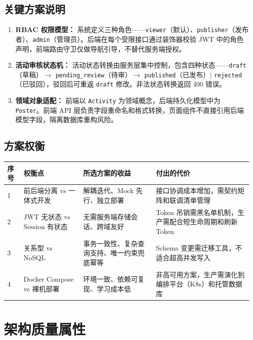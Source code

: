 \documentclass[12pt,a4paper]{ctexart}
\begin{document}
\subsection{关键方案说明}
\begin{enumerate}
\item \textbf{RBAC 权限模型：} 系统定义三种角色——\texttt{viewer}（默认）、\texttt{publisher}（发布者）、\texttt{admin}（管理员）。后端在每个受限接口通过装饰器校验 JWT 中的角色声明，前端路由守卫仅做导航引导，不替代服务端授权。
\item \textbf{活动审核状态机：} 活动状态转换由服务层集中控制，包含四种状态——\texttt{draft}（草稿）$\rightarrow$ \texttt{pending\_review}（待审）$\rightarrow$ \texttt{published}（已发布）$\mid$ \texttt{rejected}（已驳回），驳回后可重返 \texttt{draft} 修改。非法状态转换返回 400 错误。
\item \textbf{领域对象适配：} 前端以 \texttt{Activity} 为领域概念，后端持久化模型中为 \texttt{Poster}。前端 API 层负责字段重命名和格式转换，页面组件不直接引用后端模型字段，隔离数据库重构风险。
\end{enumerate}

\subsection{方案权衡}
\noindent\begin{tabularx}{\textwidth}{p{1.5cm}p{3.2cm}p{4.5cm}p{4.5cm}}
\toprule 序号 & 权衡点 & 所选方案的收益 & 付出的代价 \\\midrule
1 & 前后端分离 vs 一体式开发 & 解耦迭代、Mock 先行、独立部署 & 接口协调成本增加，需契约矩阵和联调清单管理 \\
2 & JWT 无状态 vs Session 有状态 & 无需服务端存储会话、跨域友好 & Token 吊销需黑名单机制，生产需配合短生命周期和刷新 Token \\
3 & 关系型 vs NoSQL & 事务一致性、复杂查询支持、唯一约束兜底幂等 & Schema 变更需迁移工具，不适合超高并发写入 \\
4 & Docker Compose vs 裸机部署 & 环境一致、依赖可复现、学习成本低 & 非高可用方案，生产需演化到编排平台（K8s）和托管数据库 \\
\bottomrule
\end{tabularx}

\section{架构质量属性}
\end{document}
